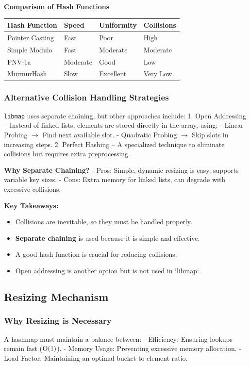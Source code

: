 \documentclass[titlepage]{article}
\begin{document}
\textbf{Comparison of Hash Functions}
\begin{center}
\begin{tabular}{@{} l l l l @{} }
\toprule
\textbf{Hash Function} & \textbf{Speed} & \textbf{Uniformity} & \textbf{Collisions} \\
\midrule
Pointer Casting & Fast & Poor & High \\
Simple Modulo & Fast & Moderate & Moderate \\
FNV-1a & Moderate & Good & Low \\
MurmurHash & Slow & Excellent & Very Low \\
\bottomrule
\end{tabular}
\end{center}

\subsubsection{Alternative Collision Handling Strategies}
\texttt{libmap} uses separate chaining, but other approaches include:
1. Open Addressing -- Instead of linked lists, elements are stored directly in the array, using:
   - Linear Probing $\rightarrow$ Find next available slot.
   - Quadratic Probing $\rightarrow$ Skip slots in increasing steps.
2. Perfect Hashing -- A specialized technique to eliminate collisions but requires extra preprocessing.

\textbf{Why Separate Chaining?}
- Pros: Simple, dynamic resizing is easy, supports variable key sizes.
- Cons: Extra memory for linked lists, can degrade with excessive collisions.

\textbf{Key Takeaways:}
\begin{itemize}
    \item Collisions are inevitable, so they must be handled properly.
    \item \textbf{Separate chaining} is used because it is simple and effective.
    \item A good hash function is crucial for reducing collisions.
    \item Open addressing is another option but is not used in `libmap`.
\end{itemize}

\subsection{Resizing Mechanism}

\subsubsection{Why Resizing is Necessary}
A hashmap must maintain a balance between:
- Efficiency: Ensuring lookups remain fast (\( $O(1)$ \)).
- Memory Usage: Preventing excessive memory allocation.
- Load Factor: Maintaining an optimal bucket-to-element ratio.
\end{document}
